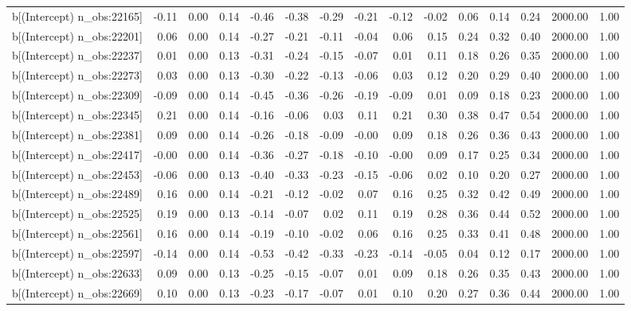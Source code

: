 \begin{table}[ht]
\begin{tabular}{rrrrrrrrrrrrrrr}
  b[(Intercept) n\_obs:22165] & -0.11 & 0.00 & 0.14 & -0.46 & -0.38 & -0.29 & -0.21 & -0.12 & -0.02 & 0.06 & 0.14 & 0.24 & 2000.00 & 1.00 \\ 
  b[(Intercept) n\_obs:22201] & 0.06 & 0.00 & 0.14 & -0.27 & -0.21 & -0.11 & -0.04 & 0.06 & 0.15 & 0.24 & 0.32 & 0.40 & 2000.00 & 1.00 \\ 
  b[(Intercept) n\_obs:22237] & 0.01 & 0.00 & 0.13 & -0.31 & -0.24 & -0.15 & -0.07 & 0.01 & 0.11 & 0.18 & 0.26 & 0.35 & 2000.00 & 1.00 \\ 
  b[(Intercept) n\_obs:22273] & 0.03 & 0.00 & 0.13 & -0.30 & -0.22 & -0.13 & -0.06 & 0.03 & 0.12 & 0.20 & 0.29 & 0.40 & 2000.00 & 1.00 \\ 
  b[(Intercept) n\_obs:22309] & -0.09 & 0.00 & 0.14 & -0.45 & -0.36 & -0.26 & -0.19 & -0.09 & 0.01 & 0.09 & 0.18 & 0.23 & 2000.00 & 1.00 \\ 
  b[(Intercept) n\_obs:22345] & 0.21 & 0.00 & 0.14 & -0.16 & -0.06 & 0.03 & 0.11 & 0.21 & 0.30 & 0.38 & 0.47 & 0.54 & 2000.00 & 1.00 \\ 
  b[(Intercept) n\_obs:22381] & 0.09 & 0.00 & 0.14 & -0.26 & -0.18 & -0.09 & -0.00 & 0.09 & 0.18 & 0.26 & 0.36 & 0.43 & 2000.00 & 1.00 \\ 
  b[(Intercept) n\_obs:22417] & -0.00 & 0.00 & 0.14 & -0.36 & -0.27 & -0.18 & -0.10 & -0.00 & 0.09 & 0.17 & 0.25 & 0.34 & 2000.00 & 1.00 \\ 
  b[(Intercept) n\_obs:22453] & -0.06 & 0.00 & 0.13 & -0.40 & -0.33 & -0.23 & -0.15 & -0.06 & 0.02 & 0.10 & 0.20 & 0.27 & 2000.00 & 1.00 \\ 
  b[(Intercept) n\_obs:22489] & 0.16 & 0.00 & 0.14 & -0.21 & -0.12 & -0.02 & 0.07 & 0.16 & 0.25 & 0.32 & 0.42 & 0.49 & 2000.00 & 1.00 \\ 
  b[(Intercept) n\_obs:22525] & 0.19 & 0.00 & 0.13 & -0.14 & -0.07 & 0.02 & 0.11 & 0.19 & 0.28 & 0.36 & 0.44 & 0.52 & 2000.00 & 1.00 \\ 
  b[(Intercept) n\_obs:22561] & 0.16 & 0.00 & 0.14 & -0.19 & -0.10 & -0.02 & 0.06 & 0.16 & 0.25 & 0.33 & 0.41 & 0.48 & 2000.00 & 1.00 \\ 
  b[(Intercept) n\_obs:22597] & -0.14 & 0.00 & 0.14 & -0.53 & -0.42 & -0.33 & -0.23 & -0.14 & -0.05 & 0.04 & 0.12 & 0.17 & 2000.00 & 1.00 \\ 
  b[(Intercept) n\_obs:22633] & 0.09 & 0.00 & 0.13 & -0.25 & -0.15 & -0.07 & 0.01 & 0.09 & 0.18 & 0.26 & 0.35 & 0.43 & 2000.00 & 1.00 \\ 
  b[(Intercept) n\_obs:22669] & 0.10 & 0.00 & 0.13 & -0.23 & -0.17 & -0.07 & 0.01 & 0.10 & 0.20 & 0.27 & 0.36 & 0.44 & 2000.00 & 1.00 \\ 

\end{tabular}
\end{table}
